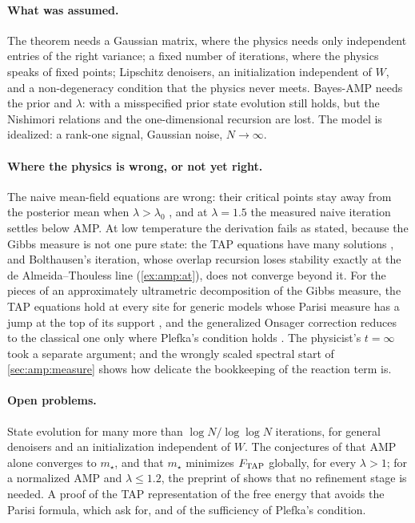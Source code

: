 \begin{refsection}
\paragraph{What was assumed.} The theorem needs a Gaussian matrix, where the physics needs only independent entries of the right variance; a fixed number of iterations, where the physics speaks of fixed points; Lipschitz denoisers, an initialization independent of $W$, and a non-degeneracy condition that the physics never meets. Bayes-AMP needs the prior and $\lambda$: with a misspecified prior state evolution still holds, but the Nishimori relations and the one-dimensional recursion are lost. The model is idealized: a rank-one signal, Gaussian noise, $N\to\infty$.

\paragraph{Where the physics is wrong, or not yet right.} The naive mean-field equations are wrong: their critical points stay away from the posterior mean when $\lambda>\lambda_0$ \parencite[Thm.~1.3]{FanMeiMontanari2021}, and at $\lambda=1.5$ the measured naive iteration settles below AMP. At low temperature the derivation fails as stated, because the Gibbs measure is not one pure state: the TAP equations have many solutions \parencite{BrayMoore1980}, and Bolthausen's iteration, whose overlap recursion loses stability exactly at the de Almeida--Thouless line (\cref{ex:amp:at}), does not converge beyond it. For the pieces of an approximately ultrametric decomposition of the Gibbs measure, the TAP equations hold at every site for generic models whose Parisi measure has a jump at the top of its support \parencite{AuffingerJagannath2019}, and the generalized Onsager correction reduces to the classical one only where Plefka's condition holds \parencite{ChenPanchenkoSubag2023}. The physicist's $t=\infty$ took \textcite{CelentanoFanMei2023} a separate argument; and the wrongly scaled spectral start of \cref{sec:amp:measure} shows how delicate the bookkeeping of the reaction term is.

\paragraph{Open problems.} State evolution for many more than $\log N/\log\log N$ iterations, for general denoisers and an initialization independent of $W$. The conjectures of \textcite[Remarks 2.5 and 4.5]{CelentanoFanMei2023} that AMP alone converges to $m_\star$, and that $m_\star$ minimizes $F_{\mathrm{TAP}}$ globally, for every $\lambda>1$; for a normalized AMP and $\lambda\le1.2$, the preprint of \textcite{LiWei2022} shows that no refinement stage is needed. A proof of the TAP representation of the free energy that avoids the Parisi formula, which \textcite{ChenPanchenko2018} ask for, and of the sufficiency of Plefka's condition.


\end{refsection}
